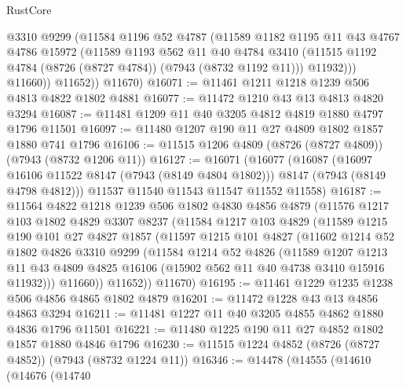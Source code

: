 \begin{lexlean}{RustCore}
\begin{coremodule}
              @3310
              @9299
              (@11584
                @1196
                @52
                @4787
                (@11589
                  @1182
                  @1195
                  @11
                  @43
                  @4767
                  @4786
                  @15972
                  (@11589
                    @1193
                    @562
                    @11
                    @40
                    @4784
                    @3410
                    (@11515 @1192 @4784 (@8726 (@8727 @4784)) (@7943 (@8732 @1192 @11)))
                    @11932)))
              @11660))
          @11652))
      @11670)
@16071 := @11461 @1211 @1218 @1239 @506 @4813 @4822 @1802 @4881
@16077 := @11472 @1210 @43 @13 @4813 @4820 @3294
@16087 := @11481 @1209 @11 @40 @3205 @4812 @4819 @1880 @4797 @1796 @11501
@16097 := @11480 @1207 @190 @11 @27 @4809 @1802 @1857 @1880 @741 @1796
@16106 := @11515 @1206 @4809 (@8726 (@8727 @4809)) (@7943 (@8732 @1206 @11))
@16127 := @16071
    (@16077
      (@16087
        (@16097 @16106 @11522 @8147 (@7943 (@8149 @4804 @1802)))
        @8147
        (@7943 (@8149 @4798 @4812)))
      @11537
      @11540
      @11543
      @11547
      @11552
      @11558)
@16187 := @11564
    @4822
    @1218
    @1239
    @506
    @1802
    @4830
    @4856
    @4879
    (@11576
      @1217
      @103
      @1802
      @4829
      @3307
      @8237
      (@11584
        @1217
        @103
        @4829
        (@11589
          @1215
          @190
          @101
          @27
          @4827
          @1857
          (@11597
            @1215
            @101
            @4827
            (@11602
              @1214
              @52
              @1802
              @4826
              @3310
              @9299
              (@11584
                @1214
                @52
                @4826
                (@11589
                  @1207
                  @1213
                  @11
                  @43
                  @4809
                  @4825
                  @16106
                  (@15902 @562 @11 @40 @4738 @3410 @15916 @11932)))
              @11660))
          @11652))
      @11670)
@16195 := @11461 @1229 @1235 @1238 @506 @4856 @4865 @1802 @4879
@16201 := @11472 @1228 @43 @13 @4856 @4863 @3294
@16211 := @11481 @1227 @11 @40 @3205 @4855 @4862 @1880 @4836 @1796 @11501
@16221 := @11480 @1225 @190 @11 @27 @4852 @1802 @1857 @1880 @4846 @1796
@16230 := @11515 @1224 @4852 (@8726 (@8727 @4852)) (@7943 (@8732 @1224 @11))
@16346 := @14478
    (@14555
      (@14610
        (@14676
          (@14740

\end{coremodule}
\end{lexlean}
